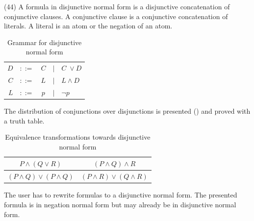 (44) A formula in disjunctive normal form is a disjunctive concatenation of conjunctive clauses.
A conjunctive clause is a conjunctive concatenation of literals. 
A literal is an atom or the negation of an atom. 

\begin{table}[htdp]
\begin{center}
\begin{tabular}{rcccl}
$D$	&$::=$ & $C$ 	&$|$ & $C \;\vee D$\\
$C$	&$::=$ & $L$ 	&$|$ & $L \wedge D$\\
$L$	&$::=$ & $p$ 	&$|$ & $\neg p$
\end{tabular}
\caption{Grammar for disjunctive normal form}
\label{tab:DNF}
\end{center}
\end{table}

The distribution of conjunctions over disjunctions is presented ()
and proved with a truth table.

\begin{table}[htdp]
\begin{center}
\begin{tabular}{cc}
$P \wedge (Q \vee R)$ 			& $(P \wedge Q) \wedge R$\\
\hline
$(P\wedge Q) \vee (P\wedge Q)$ 	& $(P\wedge R) \vee (Q\wedge R)$
\end{tabular}
\caption{Equivalence transformations towards disjunctive normal form}
\label{tab:ET_DNF}
\end{center}
\end{table}

The user has to rewrite formulas to a disjunctive normal form. 
The presented formula is in negation normal form 
but may already be in disjunctive normal form.

